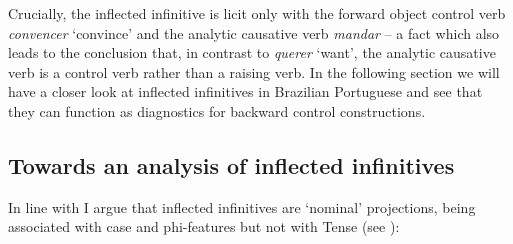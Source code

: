 \documentclass[output=paper]{langsci/langscibook}
\begin{document}
Crucially, the inflected infinitive is licit only with the forward object control verb \textit{convencer} ‘convince’ and the analytic causative verb \textit{mandar} – a fact which also leads to the conclusion that, in contrast to \textit{querer} ‘want’, the analytic causative verb is a control verb rather than a raising verb. In the following section we will have a closer look at inflected infinitives in Brazilian Portuguese and see that they can function as diagnostics for backward control constructions.

\subsection{Towards an analysis of inflected infinitives}%

In line with \citet{Raposo1987} I argue that inflected infinitives are ‘nominal’ projections, being associated with case and phi-features but not with Tense (see \citealt{Stowell1982}):

\ea%
    \label{ex:moreno:27}
    \z
\z
\end{document}
